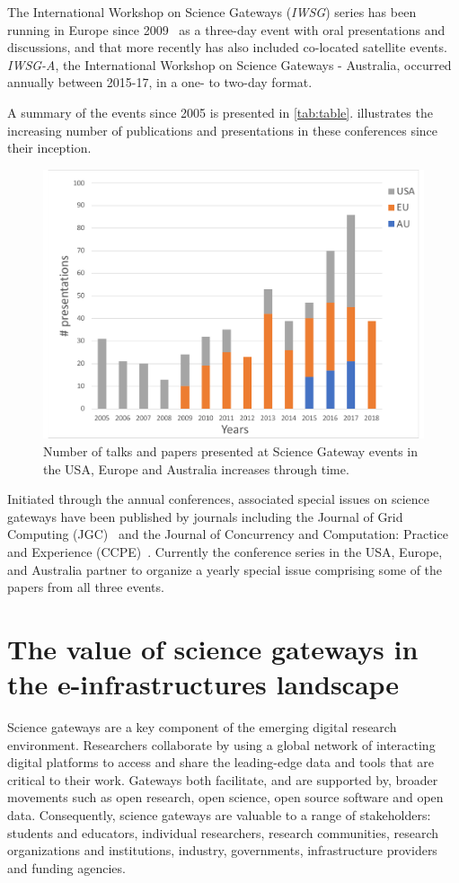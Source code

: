 \documentclass[review]{elsarticle}
\begin{document}
The International Workshop on Science Gateways (\emph{IWSG}) series has been running in Europe since 2009~\cite{iwsg-25} as a three-day event with oral presentations and discussions, and that more recently has also included co-located  satellite events. 
\emph{IWSG-A}, the International Workshop on Science Gateways - Australia, occurred annually between 2015-17, in a one- to two-day format. 

A summary of the events since 2005 is presented in \cref{tab:table}.  illustrates the increasing number of publications and presentations in these conferences since their inception.

\begin{figure}[t]
	\includegraphics[width=0.7\linewidth]{graph}
	\centering
	\caption{Number of talks and papers presented at Science Gateway events in the USA, Europe and Australia increases through time.}
	\label{fig:graph}
\end{figure}


Initiated through the annual conferences, associated special issues on science gateways have been published by journals including the Journal of
Grid Computing (JGC)~\cite{jgc2012,jgc2015-29} and the Journal of Concurrency and Computation: Practice
and Experience (CCPE)~\cite{ccpe2005,ccpe2007,ccpe2011,ccpe2013, ccpe2013-28,ccpe2014-27,ccpe2015}. 
Currently the conference series in the USA, Europe, and Australia partner to organize a yearly special issue comprising some of the papers from all three events.




\section{The value of science gateways in the e-infrastructures landscape}

Science gateways are a key component of the emerging digital research environment. Researchers collaborate by using a global network of interacting digital platforms to access and share the leading-edge data and tools that are critical to their work. Gateways both facilitate, and are supported by, broader movements such as open research, open science, open source software and open data. Consequently, science gateways are valuable to a range of stakeholders: students and educators, individual researchers, research communities, research organizations and institutions, industry, governments, infrastructure providers and funding agencies.
\end{document}
